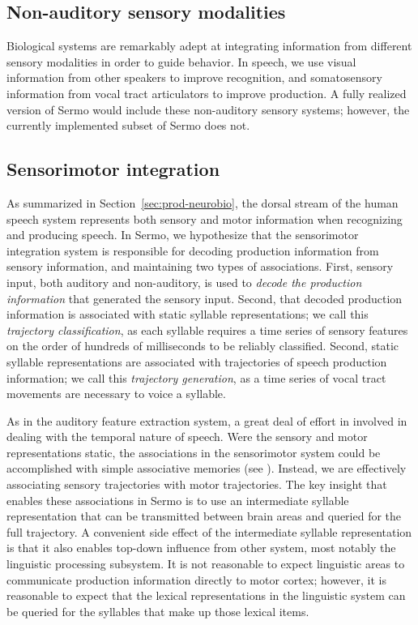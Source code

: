 \subsection{Non-auditory sensory modalities}

Biological systems are remarkably adept
at integrating information
from different sensory modalities
in order to guide behavior.
In speech,
we use visual information
from other speakers to improve recognition,
and somatosensory information
from vocal tract articulators
to improve production.
A fully realized version of Sermo
would include these non-auditory sensory systems;
however, the currently implemented
subset of Sermo does not.

\subsection{Sensorimotor integration}
\label{sec:model-sm}

As summarized in Section~\ref{sec:prod-neurobio},
the dorsal stream of the human speech system
represents both sensory and motor information
when recognizing and producing speech.
In Sermo,
we hypothesize that
the sensorimotor integration system
is responsible for decoding production information
from sensory information,
and maintaining two types of associations.
First, sensory input,
both auditory and non-auditory,
is used to \textit{decode the production information}
that generated the sensory input.
Second, that decoded production information
is associated with
static syllable representations;
we call this \textit{trajectory classification},
as each syllable requires
a time series of sensory features
on the order of hundreds of milliseconds
to be reliably classified.
Second, static syllable representations
are associated with
trajectories of speech production information;
we call this \textit{trajectory generation},
as a time series of vocal tract movements
are necessary to voice a syllable.

As in the auditory feature extraction system,
a great deal of effort in involved in
dealing with the temporal nature of speech.
Were the sensory and motor representations static,
the associations in the sensorimotor system
could be accomplished
with simple associative memories
(see \citealt{eliasmith2012,eliasmith2013}).
Instead, we are effectively associating
sensory trajectories with motor trajectories.
The key insight
that enables these associations in Sermo
is to use an intermediate syllable representation
that can be transmitted between
brain areas and queried
for the full trajectory.
A convenient side effect of
the intermediate syllable representation
is that it also enables
top-down influence from
other system,
most notably the linguistic processing subsystem.
It is not reasonable to expect
linguistic areas to communicate
production information directly
to motor cortex;
however, it is reasonable to expect
that the lexical representations
in the linguistic system
can be queried for the syllables
that make up those lexical items.

